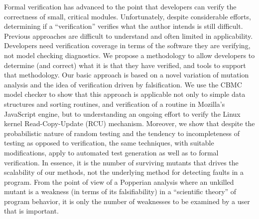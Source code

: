 Formal verification has advanced to the point that developers can verify the correctness of small, critical modules.  Unfortunately, despite considerable efforts, determining if a ``verification'' verifies what the author intends is still difficult.  Previous approaches are difficult to understand and often limited in applicability.  Developers need verification coverage in terms of the software they are verifying, not model checking diagnostics.  We propose a methodology to allow developers to determine (and correct) what it is that they have verified, and tools to support that methodology.  Our basic approach is based on a novel variation of mutation analysis and the idea of verification driven by falsification.  We use the CBMC model checker to show that this approach is applicable not only to simple data structures and sorting routines, and verification of a routine in Mozilla's JavaScript engine, but to understanding an ongoing effort to verify the Linux kernel Read-Copy-Update (RCU) mechanism.  Moreover, we show that despite the probabilistic nature of random testing and the tendency to incompleteness of testing as opposed to verification, the same techniques, with suitable modifications, apply to automated test generation as well as to formal verification.  In essence, it is the  number of surviving mutants that drives the scalability of our methods, not the underlying method for detecting faults in a program.  From the point of view of a Popperian analysis where an unkilled mutant is a weakness (in terms of its falsifiability) in a ``scientific theory'' of program behavior, it is only the number of weaknesses to be examined by a user that is important.